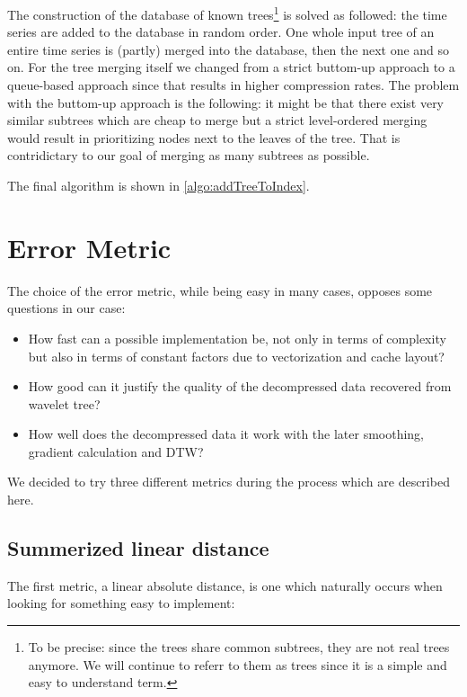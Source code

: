 The construction of the database of known trees\footnote{To be precise: since the trees share common subtrees, they are not real trees anymore. We will continue to referr to them as trees since it is a simple and easy to understand term.} is solved as followed: the time series are added to the database in random order. One whole input tree of an entire time series is (partly) merged into the database, then the next one and so on. For the tree merging itself we changed from a strict buttom-up approach to a queue-based approach since that results in higher compression rates. The problem with the buttom-up approach is the following: it might be that there exist very similar subtrees which are cheap to merge but a strict level-ordered merging would result in prioritizing nodes next to the leaves of the tree. That is contridictary to our goal of merging as many subtrees as possible.

The final algorithm is shown in \autoref{algo:addTreeToIndex}.



\section{Error Metric}
\label{sec:algorithm:error}

The choice of the error metric, while being easy in many cases, opposes some questions in our case:

\begin{itemize}
    \item How fast can a possible implementation be, not only in terms of complexity but also in terms of constant factors due to vectorization and cache layout?
    \item How good can it justify the quality of the decompressed data recovered from wavelet tree?
    \item How well does the decompressed data it work with the later smoothing, gradient calculation and DTW?
\end{itemize}

We decided to try three different metrics during the process which are described here.


\subsection{Summerized linear distance}
\label{ssec:algorithm:error:linear}

The first metric, a linear absolute distance, is one which naturally occurs when looking for something easy to implement:

